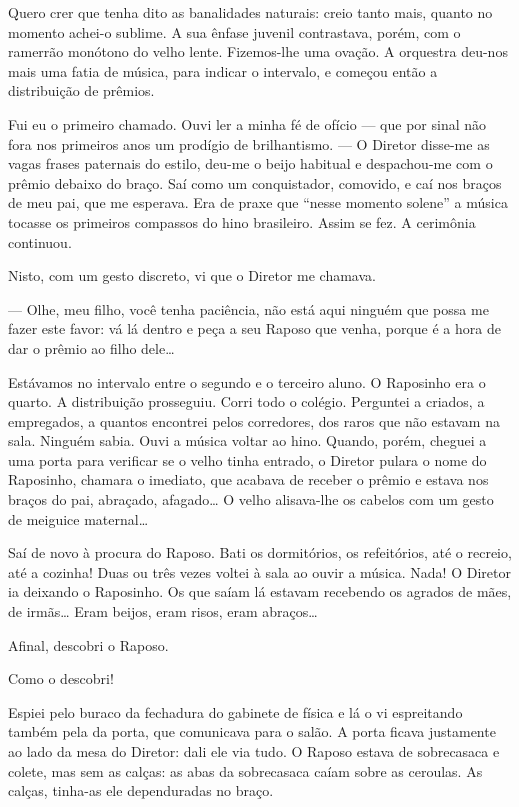 Quero crer que tenha dito as banalidades naturais: creio tanto mais,
quanto no momento achei-o sublime. A sua ênfase juvenil contrastava,
porém, com o ramerrão monótono do velho lente. Fizemos-lhe uma ovação. A
orquestra deu-nos mais uma fatia de música, para indicar o intervalo, e
começou então a distribuição de prêmios.

Fui eu o primeiro chamado. Ouvi ler a minha fé de ofício --- que por
sinal não fora nos primeiros anos um prodígio de brilhantismo. --- O
Diretor disse-me as vagas frases paternais do estilo, deu-me o beijo
habitual e despachou-me com o prêmio debaixo do braço. Saí como um
conquistador, comovido, e caí nos braços de meu pai, que me esperava.
Era de praxe que ``nesse momento solene'' a música tocasse os primeiros
compassos do hino brasileiro. Assim se fez. A cerimônia continuou.

Nisto, com um gesto discreto, vi que o Diretor me chamava.

--- Olhe, meu filho, você tenha paciência, não está aqui ninguém que
possa me fazer este favor: vá lá dentro e peça a seu Raposo que venha,
porque é a hora de dar o prêmio ao filho dele\ldots{}

Estávamos no intervalo entre o segundo e o terceiro aluno. O Raposinho
era o quarto. A distribuição prosseguiu. Corri todo o colégio. Perguntei
a criados, a empregados, a quantos encontrei pelos corredores, dos raros
que não estavam na sala. Ninguém sabia. Ouvi a música voltar ao hino.
Quando, porém, cheguei a uma porta para verificar se o velho tinha
entrado, o Diretor pulara o nome do Raposinho, chamara o imediato, que
acabava de receber o prêmio e estava nos braços do pai, abraçado,
afagado\ldots{} O velho alisava-lhe os cabelos com um gesto de meiguice
maternal\ldots{}

Saí de novo à procura do Raposo. Bati os dormitórios, os refeitórios,
até o recreio, até a cozinha! Duas ou três vezes voltei à sala ao ouvir
a música. Nada! O Diretor ia deixando o Raposinho. Os que saíam lá
estavam recebendo os agrados de mães, de irmãs\ldots{} Eram beijos, eram
risos, eram abraços\ldots{}

Afinal, descobri o Raposo.

Como o descobri!

Espiei pelo buraco da fechadura do gabinete de física e lá o vi
espreitando também pela da porta, que comunicava para o salão. A porta
ficava justamente ao lado da mesa do Diretor: dali ele via tudo. O
Raposo estava de sobrecasaca e colete, mas sem as calças: as abas da
sobrecasaca caíam sobre as ceroulas. As calças, tinha-as ele
dependuradas no braço.

